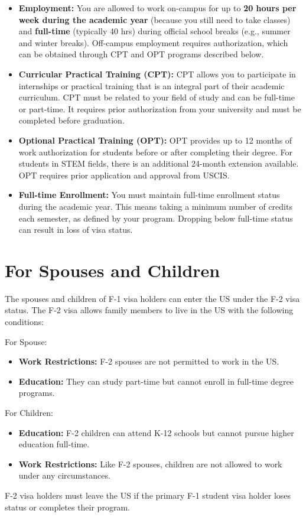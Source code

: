 \documentclass[oneside,11pt,dvipsnames]{book}
\begin{document}
\begin{itemize}
\item \textbf{Employment:} You are allowed to work on-campus for up to \textbf{20 hours per week during the academic year} (because you still need to take classes) and \textbf{full-time} (typically 40 hrs) during official school breaks (e.g., summer and winter breaks). Off-campus employment requires authorization, which can be obtained through CPT and OPT programs described below.

\item \textbf{Curricular Practical Training (CPT):} CPT allows you to participate in internships or practical training that is an integral part of their academic curriculum. CPT must be related to your field of study and can be full-time or part-time. It requires prior authorization from your university and must be completed before graduation.

\item \textbf{Optional Practical Training (OPT):} OPT provides up to 12 months of work authorization for students before or after completing their degree. For students in STEM fields, there is an additional 24-month extension available. OPT requires prior application and approval from USCIS.

\item \textbf{Full-time Enrollment:} You must maintain full-time enrollment status during the academic year. This means taking a minimum number of credits each semester, as defined by your program. Dropping below full-time status can result in loss of visa status.
\end{itemize}




\section{For Spouses and Children}

The spouses and children of F-1 visa holders can enter the US under the F-2 visa status. The F-2 visa allows family members to live in the US with the following conditions:

For Spouse: 
\begin{itemize}
\item \textbf{Work Restrictions:} F-2 spouses are not permitted to work in the US.
\item \textbf{Education:} They can study part-time but cannot enroll in full-time degree programs.
\end{itemize}
For Children:
\begin{itemize}
\item \textbf{Education:} F-2 children can attend K-12 schools but cannot pursue higher education full-time.
\item \textbf{Work Restrictions:} Like F-2 spouses, children are not allowed to work under any circumstances.
\end{itemize}
F-2 visa holders must leave the US if the primary F-1 student visa holder loses status or completes their program.
\end{document}
